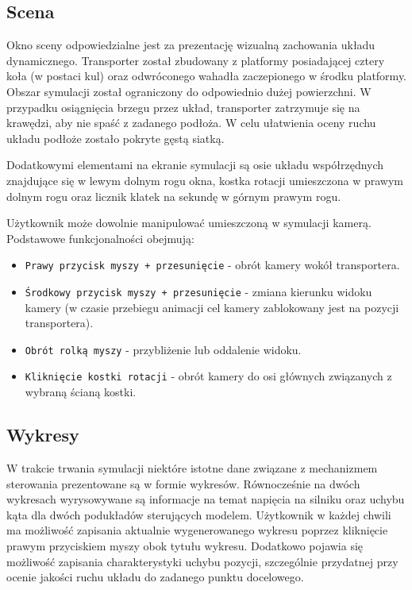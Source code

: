 \documentclass[12pt, oneside]{report}
\theoremstyle{definition}
\begin{document}
\subsection{Scena}
Okno sceny odpowiedzialne jest za prezentację wizualną zachowania układu dynamicznego. Transporter został zbudowany z platformy posiadającej cztery koła (w postaci kul) oraz odwróconego wahadła zaczepionego w środku platformy. Obszar symulacji został ograniczony do odpowiednio dużej powierzchni. W przypadku osiągnięcia brzegu przez układ, transporter zatrzymuje się na krawędzi, aby nie spaść z zadanego podłoża. W celu ułatwienia oceny ruchu układu podłoże zostało pokryte gęstą siatką.

Dodatkowymi elementami na ekranie symulacji są osie układu współrzędnych znajdujące się w lewym dolnym rogu okna, kostka rotacji umieszczona w prawym dolnym rogu oraz licznik klatek na sekundę w górnym prawym rogu.

Użytkownik może dowolnie manipulować umieszczoną w symulacji kamerą. Podstawowe funkcjonalności obejmują:
\begin{itemize}
\item \texttt{Prawy przycisk myszy + przesunięcie} - obrót kamery wokół transportera.
\item \texttt{Środkowy przycisk myszy + przesunięcie} - zmiana kierunku widoku kamery (w czasie przebiegu animacji cel kamery zablokowany jest na pozycji transportera).
\item \texttt{Obrót rolką myszy} - przybliżenie lub oddalenie widoku.
\item \texttt{Kliknięcie kostki rotacji} - obrót kamery do osi głównych związanych z wybraną ścianą kostki.
\end{itemize}

\subsection{Wykresy}
W trakcie trwania symulacji niektóre istotne dane związane z mechanizmem sterowania prezentowane są w formie wykresów. Równocześnie na dwóch wykresach wyrysowywane są informacje na temat napięcia na silniku oraz uchybu kąta dla dwóch podukładów sterujących modelem. Użytkownik w każdej chwili ma możliwość zapisania aktualnie wygenerowanego wykresu poprzez kliknięcie prawym przyciskiem myszy obok tytułu wykresu. Dodatkowo pojawia się możliwość zapisania charakterystyki uchybu pozycji, szczególnie przydatnej przy ocenie jakości ruchu układu do zadanego punktu docelowego.
\end{document}
